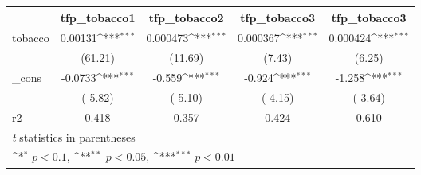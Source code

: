 {
\def\sym#1{\ifmmode^{#1}\else\(^{#1}\)\fi}
\begin{tabular}{l*{4}{c}}
\hline\hline
            &\multicolumn{1}{c}{tfp\_tobacco1}&\multicolumn{1}{c}{tfp\_tobacco2}&\multicolumn{1}{c}{tfp\_tobacco3}&\multicolumn{1}{c}{tfp\_tobacco3}\\
\hline
tobacco     &     0.00131\sym{***}&    0.000473\sym{***}&    0.000367\sym{***}&    0.000424\sym{***}\\
            &     (61.21)         &     (11.69)         &      (7.43)         &      (6.25)         \\
[1em]
\_cons      &     -0.0733\sym{***}&      -0.559\sym{***}&      -0.924\sym{***}&      -1.258\sym{***}\\
            &     (-5.82)         &     (-5.10)         &     (-4.15)         &     (-3.64)         \\
\hline
r2          &       0.418         &       0.357         &       0.424         &       0.610         \\
\hline\hline
\multicolumn{5}{l}{\footnotesize \textit{t} statistics in parentheses}\\
\multicolumn{5}{l}{\footnotesize \sym{*} \(p<0.1\), \sym{**} \(p<0.05\), \sym{***} \(p<0.01\)}\\
\end{tabular}
}
